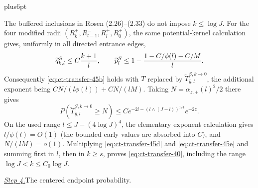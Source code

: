 \documentclass[12pt,reqno]{amsart}
\makeatletter
\theoremstyle{plain}
\theoremstyle{definition}
\theoremstyle{remark}
\renewenvironment{proof}[1][\proofname]{%
  \par
  \pushQED{\qed}%
  \normalfont
  \topsep6pt plus6pt\relax
  \trivlist
  \item[\hskip\labelsep\slshape #1\@addpunct{.}]%
  \ignorespaces
}{%
  \popQED
  \endtrivlist
  \@endpefalse
}
\DeclareRobustCommand{\qed}{%
  \leavevmode\unskip\penalty9999\hbox{}\nobreak
  \ifmmode
    \makebox[0pt][l]{\qquad\hbox{\qedsymbol}}%
  \else
    \qquad\hbox{\qedsymbol}%
  \fi
}
\renewcommand{\qedsymbol}{\rule[.47pt]{4pt}{6pt}}
\numberwithin{equation}{section}
\makeatother
\begin{document}
\begin{proof}[Proof of Lemma~\ref{lem:buffered-transfer}]
The buffered inclusions in Rosen (2.26)--(2.33) do not impose
$k\le\log J$.  For the four modified radii
$(R_k^+,R_{l-1}^-,R_l^+,R_0^+)$, the same potential-kernel
calculation gives, uniformly in all directed entrance edges,
\begin{equation}
\widetilde q_{k,l}^S\le C{k+1\over l},\qquad
 \widetilde p_l^S
 \le1-\frac{1-C/\phi(l)-C/M}{l}.\label{eq:ct-transfer-45d2}
\end{equation}
Consequently \eqref{eq:ct-transfer-45b} holds with $T$ replaced by
$\widetilde T_{\widehat y,l}^{S,k\to0}$, the additional exponent being
$CN/(l\phi(l))+CN/(lM)$.  Taking
$N=\alpha_{z,+}(l)^2/2$ there gives
\begin{equation}
P(\widetilde T_{\widehat y,l}^{S,k\to0}\ge N)
 \le C e^{-2l-(l\wedge(J-l))^{1/4}}e^{-2z}.\label{eq:ct-transfer-45e}
\end{equation}
On the used range $l\le J-(4\log J)^4$, the elementary exponent
calculation gives $l/\phi(l)=O(1)$ (the bounded early values are
absorbed into $C$), and $N/(lM)=o(1)$.  Multiplying \eqref{eq:ct-transfer-45d} and \eqref{eq:ct-transfer-45e}
and summing first in $l$, then in $k\ge s$, proves \eqref{eq:ct-transfer-40}, including
the range $\log J<k\le C_0\log J$.

\smallskip\noindent
\underline{\textit{Step 4.}}\quad The centered endpoint probability.


\end{proof}
\end{document}

